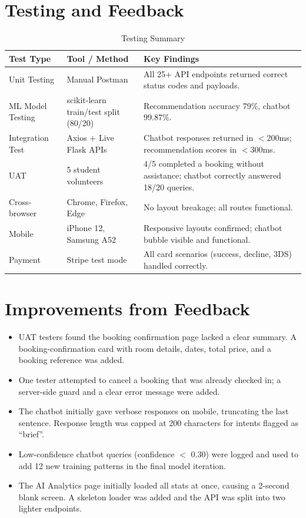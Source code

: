 \documentclass[12pt,a4paper]{report}
\begin{document}
\section{Testing and Feedback}

\begin{table}[H]
\centering
\begin{tabularx}{\textwidth}{l l X}
\toprule
\textbf{Test Type} & \textbf{Tool / Method} & \textbf{Key Findings} \\
\midrule
Unit Testing     & Manual Postman           & All 25+ API endpoints returned correct status codes and payloads. \\
ML Model Testing & scikit-learn train/test split (80/20) & Recommendation accuracy 79\%, chatbot 99.87\%. \\
Integration Test & Axios + Live Flask APIs  & Chatbot responses returned in $<$200ms; recommendation scores in $<$300ms. \\
UAT              & 5 student volunteers     & 4/5 completed a booking without assistance; chatbot correctly answered 18/20 queries. \\
Cross-browser    & Chrome, Firefox, Edge    & No layout breakage; all routes functional. \\
Mobile           & iPhone 12, Samsung A52   & Responsive layouts confirmed; chatbot bubble visible and functional. \\
Payment          & Stripe test mode         & All card scenarios (success, decline, 3DS) handled correctly. \\
\bottomrule
\end{tabularx}
\caption{Testing Summary}
\end{table}

\section{Improvements from Feedback}

\begin{itemize}[leftmargin=*, label=\textbullet]
  \item UAT testers found the booking confirmation page lacked a clear summary. A booking-confirmation card with room details, dates, total price, and a booking reference was added.
  \item One tester attempted to cancel a booking that was already checked in; a server-side guard and a clear error message were added.
  \item The chatbot initially gave verbose responses on mobile, truncating the last sentence. Response length was capped at 200 characters for intents flagged as ``brief''.
  \item Low-confidence chatbot queries (confidence $<$ 0.30) were logged and used to add 12 new training patterns in the final model iteration.
  \item The AI Analytics page initially loaded all stats at once, causing a 2-second blank screen. A skeleton loader was added and the API was split into two lighter endpoints.
\end{itemize}
\end{document}
